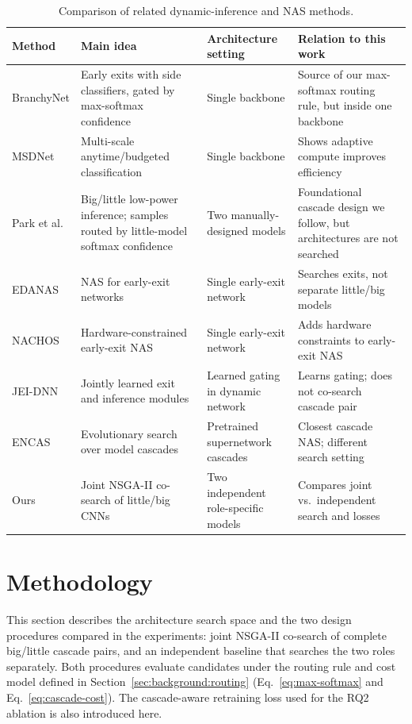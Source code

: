 \documentclass[conference]{IEEEtran}
\begin{document}
\begin{table}[t]
\centering
\small
\caption{Comparison of related dynamic-inference and NAS methods.}
\label{tab:related-comparison}
\begin{tabular}{p{}p{}p{}p{}}
\toprule
Method & Main idea & Architecture setting & Relation to this work \\
\midrule
BranchyNet \cite{teerapittayanon2017branchynet} &
Early exits with side classifiers, gated by max-softmax confidence &
Single backbone &
Source of our max-softmax routing rule, but inside one backbone \\
MSDNet \cite{huang2018msdnet} &
Multi-scale anytime/budgeted classification &
Single backbone &
Shows adaptive compute improves efficiency \\
Park et al.\ \cite{park2015biglittle} &
Big/little low-power inference; samples routed by little-model softmax confidence &
Two manually-designed models &
Foundational cascade design we follow, but architectures are not searched \\
EDANAS \cite{gambella2023edanas} &
NAS for early-exit networks &
Single early-exit network &
Searches exits, not separate little/big models \\
NACHOS \cite{gambella2025nachos} &
Hardware-constrained early-exit NAS &
Single early-exit network &
Adds hardware constraints to early-exit NAS \\
JEI-DNN \cite{regol2024jeidnn} &
Jointly learned exit and inference modules &
Learned gating in dynamic network &
Learns gating; does not co-search cascade pair \\
ENCAS \cite{chebykin2022encas} &
Evolutionary search over model cascades &
Pretrained supernetwork cascades &
Closest cascade NAS; different search setting \\
Ours &
Joint NSGA-II co-search of little/big CNNs &
Two independent role-specific models &
Compares joint vs.\ independent search and losses \\
\bottomrule
\end{tabular}
\end{table}

\section{Methodology}
\label{sec:methodology}

This section describes the architecture search space and the two design
procedures compared in the experiments: joint NSGA-II co-search of complete
big/little cascade pairs, and an independent baseline that searches the two
roles separately. Both procedures evaluate candidates under the routing rule
and cost model defined in
Section~\ref{sec:background:routing} (Eq.~\ref{eq:max-softmax} and
Eq.~\ref{eq:cascade-cost}). The cascade-aware retraining loss used for the
RQ2 ablation is also introduced here.
\end{document}
